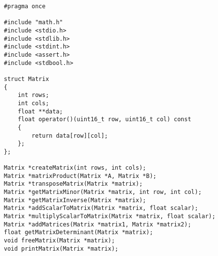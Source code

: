 \begin{lstlisting}[caption=\raggedright{mcu-libs/Matrix.h}, frame=single]
#pragma once

#include "math.h"
#include <stdio.h>
#include <stdlib.h>
#include <stdint.h>
#include <assert.h>
#include <stdbool.h>

struct Matrix
{
    int rows;
    int cols;
    float **data;
    float operator()(uint16_t row, uint16_t col) const
    {
        return data[row][col];
    };
};

Matrix *createMatrix(int rows, int cols);
Matrix *matrixProduct(Matrix *A, Matrix *B);
Matrix *transposeMatrix(Matrix *matrix);
Matrix *getMatrixMinor(Matrix *matrix, int row, int col);
Matrix *getMatrixInverse(Matrix *matrix);
Matrix *addScalarToMatrix(Matrix *matrix, float scalar);
Matrix *multiplyScalarToMatrix(Matrix *matrix, float scalar);
Matrix *addMatrices(Matrix *matrix1, Matrix *matrix2);
float getMatrixDeterminant(Matrix *matrix);
void freeMatrix(Matrix *matrix);
void printMatrix(Matrix *matrix);
\end{lstlisting}